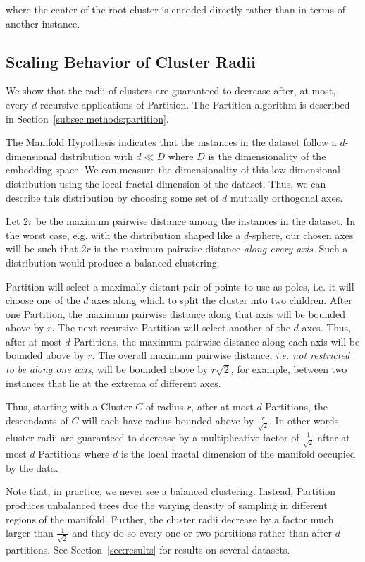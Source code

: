 where the center of the root cluster is encoded directly rather than in terms of another instance.


\subsection{Scaling Behavior of Cluster Radii}
\label{subsec:methods:radii-scaling-behavior}

We show that the radii of clusters are guaranteed to decrease after, at most, every $d$ recursive applications of Partition.
The Partition algorithm is described in Section~\ref{subsec:methods:partition}.

The Manifold Hypothesis indicates that the instances in the dataset follow a $d$-dimensional distribution with $d \ll D$ where $D$ is the dimensionality of the embedding space.
We can measure the dimensionality of this low-dimensional distribution using the local fractal dimension of the dataset.
Thus, we can describe this distribution by choosing some set of $d$ mutually orthogonal axes.

Let $2r$ be the maximum pairwise distance among the instances in the dataset.
In the worst case, e.g. with the distribution shaped like a $d$-sphere, our chosen axes will be such that $2r$ is the maximum pairwise distance \textit{along every axis}.
Such a distribution would produce a balanced clustering.

Partition will select a maximally distant pair of points to use as poles, i.e. it will choose one of the $d$ axes along which to split the cluster into two children.
After one Partition, the maximum pairwise distance along that axis will be bounded above by $r$.
The next recursive Partition will select another of the $d$ axes.
Thus, after at most $d$ Partitions, the maximum pairwise distance along each axis will be bounded above by $r$.
The overall maximum pairwise distance, \textit{i.e. not restricted to be along one axis}, will be bounded above by $r \sqrt{2}$, for example, between two instances that lie at the extrema of different axes.

Thus, starting with a Cluster $C$ of radius $r$, after at most $d$ Partitions, the descendants of $C$ will each have radius bounded above by $\frac{r}{\sqrt{2}}$.
In other words, cluster radii are guaranteed to decrease by a multiplicative factor of $\frac{1}{\sqrt{2}}$ after at most $d$ Partitions where $d$ is the local fractal dimension of the manifold occupied by the data.

Note that, in practice, we never see a balanced clustering.
Instead, Partition produces unbalanced trees due the varying density of sampling in different regions of the manifold.
Further, the cluster radii decrease by a factor much larger than $\frac{1}{\sqrt{2}}$ and they do so every one or two partitions rather than after $d$ partitions.
See Section~\ref{sec:results} for results on several datasets.


